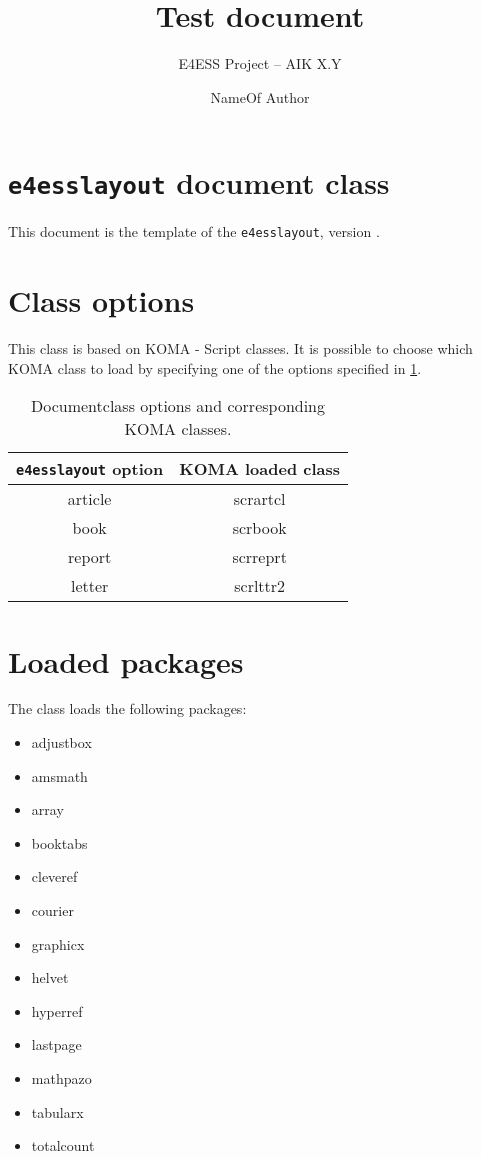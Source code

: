 \documentclass[a4paper,article]{e4esslayout}
\title{%
	Test document
}
\subtitle{%
	E4ESS Project -- AIK X.Y
}
\author{%
	NameOf Author
}
\begin{document}



\section{\texttt{e4esslayout} document class}
\label{sec:declaration}
This document is the template of the \texttt{e4esslayout}, version .

\section{Class options}
\label{sec:cla-opt}
This class is based on \textsf{KOMA - Script} classes.
It is possible to choose which \textsf{KOMA} class to load by specifying one of the options specified in \cref{tab:doc-opt}.
\begin{table}[b]
	\centering
	\caption{Documentclass options and corresponding \textsf{KOMA} classes.}
	\label{tab:doc-opt}
	\begin{tabular}{cc}
	\toprule
	\texttt{e4esslayout} option & \textsf{KOMA} loaded class \\
	\toprule
	article & scrartcl \\
	book    & scrbook \\
	report  & scrreprt \\
	letter  & scrlttr2 \\
	\bottomrule
	\end{tabular}
\end{table}

\section{Loaded packages}
\label{sec:loa-pac}
The class loads the following packages:
\begin{itemize}
	\item adjustbox
	\item amsmath
	\item array
	\item booktabs
	\item cleveref
	\item courier
	\item graphicx
	\item helvet
	\item hyperref
	\item lastpage
	\item mathpazo
	\item tabularx
	\item totalcount
\end{itemize}
\end{document}
